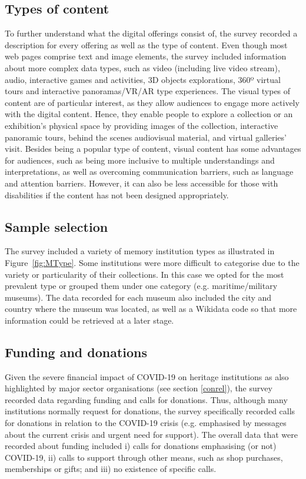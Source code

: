 \documentclass{egpubl}
\begin{document}
\subsection{Types of content}
\label{typ}
To further understand what the digital offerings consist of, the survey recorded a description for every offering as well as the type of content. Even though most web pages comprise text and image elements, the survey included information about more complex data types, such as video (including live video stream), audio, interactive games and activities, 3D objects explorations, 360º virtual tours and interactive panoramas/VR/AR type experiences.
The visual types of content are of particular interest, as they allow audiences to engage more actively with the digital content. Hence, they enable people to explore a collection or an exhibition's physical space by providing images of the collection, interactive panoramic tours, behind the scenes audiovisual material, and virtual galleries' visit. Besides being a popular type of content, visual content has some advantages for audiences, such as being more inclusive to multiple understandings and interpretations, as well as overcoming communication barriers, such as language and attention barriers. However, it can also be less accessible for those with disabilities if the content has not been designed appropriately.

\subsection{Sample selection}
The survey included a variety of memory institution types as illustrated in Figure~\ref{fig:MType}. Some institutions were more difficult to categorise due to the variety or particularity of their collections. In this case we opted for the most prevalent type or grouped them under one category (e.g. maritime/military museums). The data recorded for each museum also included the city and country where the museum was located, as well as a Wikidata code so that more information could be retrieved at a later stage.

\subsection{Funding and donations}
\label{fund}
Given the severe financial impact of COVID-19 on heritage institutions as also highlighted by major sector organisations (see section \ref{conrel}), the survey recorded data regarding funding and calls for donations. Thus, although many institutions normally request for donations, the survey specifically recorded calls for donations in relation to the COVID-19 crisis (e.g. emphasised by messages about the current crisis and urgent need for support). The overall data that were recorded about funding included i) calls for donations emphasising (or not)  COVID-19, ii) calls to support through other means, such as shop purchases, memberships or gifts; and iii) no existence of specific calls.
\end{document}

